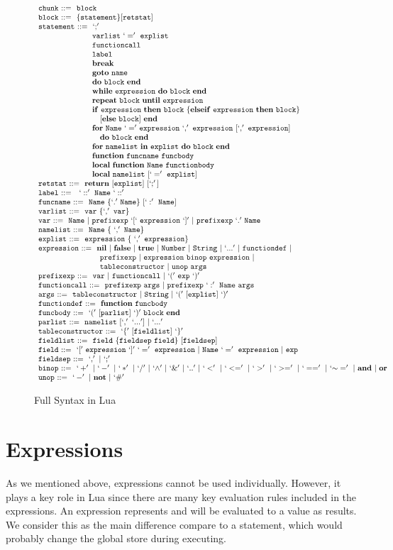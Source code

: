\begin{figure}
\caption{Full Syntax in Lua}
\label{fig:LuaSynFull}
\[
\begin{array}{llr}
  {\tt chunk}{\tt ~::=}{\tt ~~block}\\
  {\tt block}{\tt ~::=}{\tt ~~\{statement\}[retstat]}\\
  {\tt statement}{\tt ~::=}{\tt ~~`;'}\\
  {\tt \quad\quad\quad\quad\quad\quad~}{\tt ~~varlist~`='~explist}\\
  {\tt \quad\quad\quad\quad\quad\quad~}{\tt ~~functioncall}\\
  {\tt \quad\quad\quad\quad\quad\quad~}{\tt ~~label}\\
  {\tt \quad\quad\quad\quad\quad\quad~}{\tt ~~\bf break}\\
  {\tt \quad\quad\quad\quad\quad\quad~}{\tt ~~{\bf goto}~name}\\
  {\tt \quad\quad\quad\quad\quad\quad~}{\tt ~~{\bf do}~block~{\bf end}}\\
  {\tt \quad\quad\quad\quad\quad\quad~}{\tt ~~{\bf while}~expression~{\bf do}~block~{\bf end}}\\
  {\tt \quad\quad\quad\quad\quad\quad~}{\tt ~~{\bf repeat}~block~{\bf until}~expression}\\
  {\tt \quad\quad\quad\quad\quad\quad~}{\tt ~~{\bf if}~expression~{\bf then}~block~\{{\bf elseif} ~ expression~{\bf then}~block\}}\\ 
  {\tt \quad\quad\quad\quad\quad\quad~}{\tt ~~\quad[{\bf else}~ block] ~ {\bf end}}\\
  {\tt \quad\quad\quad\quad\quad\quad~}{\tt ~~{\bf for}~Name~{\bf `='}~expression~`,'~expression~[`,'~expression]}\\
  {\tt \quad\quad\quad\quad\quad\quad~}{\tt ~~\quad{\bf do}~block~{\bf end}}\\
  {\tt \quad\quad\quad\quad\quad\quad~}{\tt ~~{\bf for}~namelist~{\bf in}~explist~{\bf do}~block~{\bf end}}\\
  {\tt \quad\quad\quad\quad\quad\quad~}{\tt ~~{\bf function}~funcname~funcbody}\\
  {\tt \quad\quad\quad\quad\quad\quad~}{\tt ~~{\bf local}~{\bf function}~Name~functionbody}\\
  {\tt \quad\quad\quad\quad\quad\quad~}{\tt ~~{\bf local}~namelist~[`='~explist]}\\
  {\tt retstat}{\tt ~::=}{\tt ~~{\bf return}~[explist]~[`;']}\\
  {\tt label}{\tt ~::=}{\tt ~~~`::'~Name~`::'}\\
  {\tt funcname}{\tt ~::=}{\tt ~~Name~\{`.'~Name\}~[`:'~Name]}\\
  {\tt varlist}{\tt ~::=}{\tt ~~var~\{`,'~var\}}\\
  {\tt var}{\tt ~::=}{\tt ~~Name ~|~prefixexp~`[`~expression~`]'~|~prefixexp~`.'~Name}\\
  {\tt namelist}{\tt ~::=}{\tt ~~Name~\{~`,'~Name\}}\\
  {\tt explist}{\tt ~::=}{\tt ~~expression~\{~`,'~expression\}}\\
  {\tt expression}{\tt ~::=}{\tt ~~{\bf nil} ~|~{\bf false}~|~{\bf true}~|~Number~|~String~|~`...'~|~functiondef~|}\\
  {\tt \quad\quad\quad\quad\quad\quad~}{\tt ~~\quad prefixexp~|~expression~binop~expression~|}\\
  {\tt \quad\quad\quad\quad\quad\quad~}{\tt ~~\quad tableconstructor~|~unop~args}\\
  {\tt prefixexp}{\tt ~::=}{\tt ~~var ~|~functioncall~|~`('~exp~`)'}\\
  {\tt functioncall}{\tt ~::=}{\tt ~~prefixexp~args ~|~prefixexp~`:'~Name~args}\\
  {\tt args}{\tt ~::=}{\tt ~~tableconstructor ~|~String~|~`('~[explist]~`)'}\\
  {\tt functiondef}{\tt ~::=}{\tt ~~{\bf function}~funcbody}\\
  {\tt funcbody}{\tt ~::=}{\tt ~~`('~[parlist]~ `)'~block~{\bf end}}\\
  {\tt parlist}{\tt ~::=}{\tt ~~namelist~[`,'~`...']~|~`...'}\\
  {\tt tableconstructor}{\tt ~::=}{\tt ~~`\{' ~[fieldlist]~`\}'}\\
  {\tt fieldlist}{\tt ~::=}{\tt ~~field ~\{fieldsep~field\}~[fieldsep]}\\
  {\tt field}{\tt ~::=}{\tt ~~`[' ~expression~ `]'~`='~expression~|~Name~`='~expression~|~exp}\\
  {\tt fieldsep}{\tt ~::=}{\tt ~~`,' ~|~`;'}\\
  {\tt binop}{\tt ~::=}{\tt ~~`+'~|~`-'~|~`*'~|~`/'~|~`{\wedge}'~|~`\&'~|~`..'~|~`<'~|~`<='~|~`>'~|~`>='~|~`=='~|~`{\sim}='~|~{\bf and}~|~{\bf or}}\\
  {\tt unop}{\tt ~::=}{\tt ~~`-'~|~{\bf not}~|~`\#'}\\
\end{array}
\]
\end{figure}




\section{Expressions}
As we mentioned above, expressions cannot be used individually. However, it plays a key role in Lua since there are many key evaluation rules included in the expressions. An expression represents and will be evaluated to a value as results. We consider this as the main difference compare to a statement, which would probably change the global store during executing.

